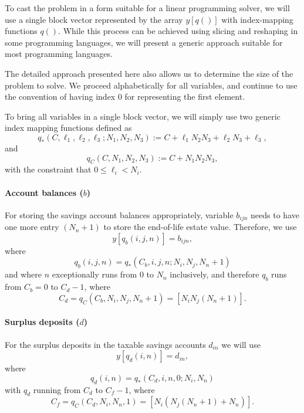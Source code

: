 \documentclass{report}[fleqn,12pt]
\begin{document}
To cast the problem in a form suitable for a linear programming solver, we will use
a single block vector represented by the array $y[q()]$ with index-mapping functions $q()$.
While this process can be achieved using slicing and reshaping in some programming
languages, we will present a generic approach suitable for most programming languages.

The detailed approach presented here also allows us to determine the size of the problem to solve.
We proceed alphabetically for all variables, and continue to use the convention of having
index 0 for representing the first element.

To bring all variables in a single block vector,
we will simply use two generic index mapping functions defined as
\begin{equation}
	q_*(C, \ell_1, \ell_2, \ell_3 ; N_1, N_2, N_3) :=
	C + \ell_1N_2N_3 + \ell_2N_3 + \ell_3 ,
\end{equation}
and
\begin{equation}
	q_C(C, N_1, N_2, N_3) :=
	C + N_1N_2N_3,
\end{equation}
with the constraint that $0 \le \ell_i < N_i$.

\paragraph*{Account balances (\boldmath$b$)}
For storing the savings account balances appropriately, variable $b_{ijn}$ needs to have one
more entry $(N_n + 1)$ to
store the end-of-life estate value. Therefore, we use
\begin{equation}
	y[q_b(i, j, n)] = b_{ijn},
\end{equation}
where
\begin{equation}
	\label{Eq:Extra}
	q_b(i, j, n) = q_*(C_b, i, j, n; N_i, N_j, N_n+1)
\end{equation}
and where $n$ exceptionally runs from 0 to $N_n$ inclusively, and therefore
$q_b$ runs from $C_b = 0$ to $C_{d} - 1$,
where
\[
	C_{d} = q_C(C_b, N_i, N_j, N_n+1) = [N_i N_j (N_n+1)].
\]

\paragraph*{Surplus deposits (\boldmath$d$)}
For the surplus deposits in the taxable savings accounts $d_{in}$ we will use
\begin{equation}
	y[q_d(i, n)] = d_{in},
\end{equation}
where
\begin{equation}
	q_d(i, n) = q_*(C_d, i, n, 0; N_i, N_n)
\end{equation}
with $q_d$ running from $C_d$ to $C_f - 1$, where
\[
	C_f = q_C(C_d, N_i, N_n, 1) = [N_i(N_j(N_n+1) + N_n)].
\]
\end{document}
